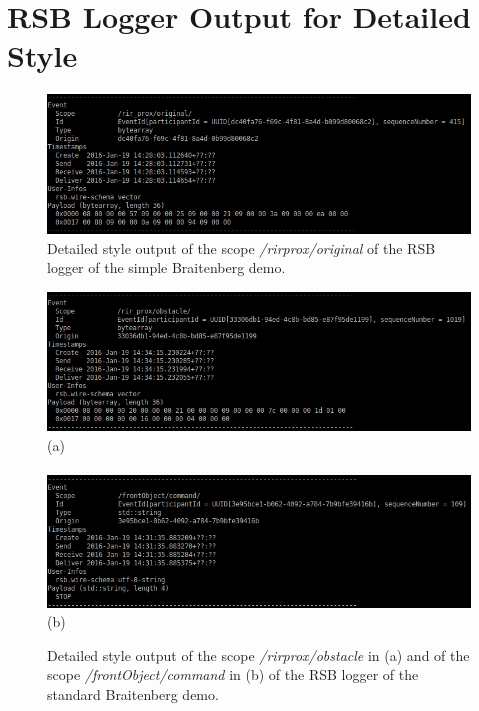 \chapter{RSB Logger Output for Detailed Style}


\begin{figure}[htb]
\begin{center}
\includegraphics[scale=0.55]{Bilder/rsbloggerpics/rsb_br_simple_detailed.png}
\caption{Detailed style output of the scope {\it /rir\-prox/original} of the RSB logger of the simple Braitenberg demo.}
\label{fig:rsbloggersimpledetailed}
\end{center}
\end{figure}


\begin{figure}[htb]
\begin{center}
\includegraphics[scale=0.55]{Bilder/rsbloggerpics/rsb_br_standard_detailed-obstacleFront.png} \\
(a) \\
\quad\\
\includegraphics[scale=0.55]{Bilder/rsbloggerpics/rsb_br_standard_detailed-command.png} \\
(b)
\caption{Detailed style output of the scope {\it /rir\-prox/obstacle} in (a) and of the scope {\it /frontObject/command} in (b) of the RSB logger of the standard Braitenberg demo.}
\label{fig:rsbloggerstandarddetailed}
\end{center}
\end{figure}